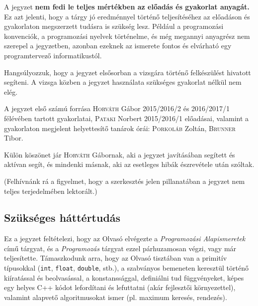 \documentclass[a4paper,11.5pt,table]{article}
\begin{document}
	A jegyzet \textbf{nem fedi le teljes mértékben az előadás és gyakorlat anyagát.} Ez azt jelenti, hogy a tárgy jó eredménnyel történő teljesítéséhez az előadáson és gyakorlaton megszerzett tudásra is szükség lesz. Például a programozási konvenciók, a programozási nyelvek történelme, és még megannyi anyagrész nem szerepel a jegyzetben, azonban ezeknek az ismerete fontos és elvárható egy programtervező informatikustól.
	
	\smallskip
	Hangsúlyozzuk, hogy a jegyzet elsősorban a vizsgára történő felkészülést hivatott segíteni. A vizsga közben a jegyzet használata szükséges gyakorlat nélkül nem elég.
	
	\smallskip
	A jegyzet első számú forrása \textsc{Horváth} Gábor 2015/2016/2 és 2016/2017/1 félévében tartott gyakorlatai, \textsc{Pataki} Norbert 2015/2016/1 előadásai, valamint a gyakorlaton megjelent helyettesítő tanárok órái: \textsc{Porkoláb} Zoltán, \textsc{Brunner} Tibor.
	
	Külön köszönet jár \textsc{Horváth} Gábornak, aki a jegyzet javításában segített és aktívan segít, és mindenki másnak, aki az esetleges hibák észrevétele után szóltak.
	
	(Felhívnánk rá a figyelmet, hogy a szerkesztés jelen pillanatában a jegyzet nem teljes terjedelmében lektorált.)

	\subsection{Szükséges háttértudás}
	Ez a jegyzet feltételezi, hogy az Olvasó elvégezte a \emph{Programozási Alapismeretek} című tárgyat, és a \emph{Programozás} tárgyat ezzel párhuzamosan végzi, vagy már teljesítette. Támaszkodunk arra, hogy az Olvasó tisztában van a primitív típusokkal (\texttt{int}, \texttt{float}, \texttt{double}, stb.), a szabványos bemeneten keresztül történő kiíratással és beolvasással, a konstanssággal, definiálni tud függvényeket, képes egy helyes C++ kódot lefordítani és lefuttatni (akár fejlesztői környezettel), valamint alapvető algoritmusokat ismer (pl. maximum keresés, rendezés).
\end{document}

